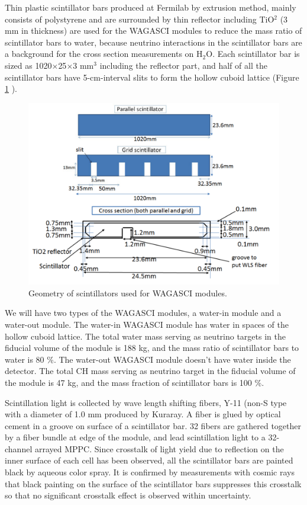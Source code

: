 Thin plastic scintillator bars produced at Fermilab by extrusion method, mainly consists of polystyrene and are surrounded by thin reflector including TiO$^{2}$ (3 mm in thickness) are used for the WAGASCI modules to reduce the mass ratio of scintillator bars to water,
because neutrino interactions in the scintillator bars are a background for the cross section measurements on H$_{2}$O.
Each scintillator bar is sized as 1020$\times$25$\times$3 mm$^{3}$ including the reflector part, and 
half of all the scintillator bars have 5-cm-interval slits to form the hollow cuboid lattice (Figure \ref{fig:wagasci_scinti_geometry} ). 

\begin{figure}[tbh]
\begin{center}
\includegraphics[width=0.8\linewidth]{fig/wagasci_scinti_geometry.pdf}
\end{center}
\caption{
Geometry of scintillators used for WAGASCI modules.
}
\label{fig:wagasci_scinti_geometry}
\end{figure}


We will have two types of the WAGASCI modules, a water-in module and a water-out module.
The water-in WAGASCI module has water in spaces of the hollow cuboid lattice.
The total water mass serving as neutrino targets in the fiducial volume of the module is 188 kg,
and the mass ratio of scintillator bars to water is 80 \%.
The water-out WAGASCI module doesn't have water inside the detector.
The total CH mass serving as neutrino target in the fiducial volume of the module is 47 kg,
and the mass fraction of scintillator bars is 100 \%.


Scintillation light is collected by wave length shifting fibers, Y-11 (non-S type  with a diameter of 1.0 mm produced by Kuraray. 
A fiber is glued by optical cement in a groove on surface of a scintillator bar. 
32 fibers are gathered together by a fiber bundle at edge of the module, and lead scintillation light to a 32-channel arrayed MPPC.
Since crosstalk of light yield due to reflection on the inner surface of each cell has been observed, all the scintillator bars are painted black by aqueous color spray.
It is confirmed by measurements with cosmic rays that black painting on the surface of the scintillator bars suppresses this crosstalk so that no significant crosstalk effect is observed within uncertainty.



